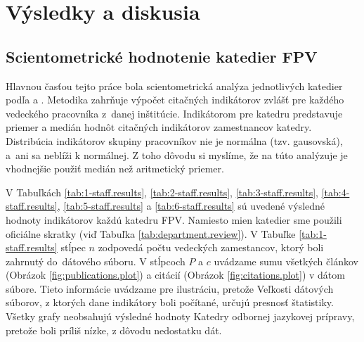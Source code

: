 \chapter{Výsledky a diskusia}

\section{Scientometrické hodnotenie katedier FPV}

Hlavnou časťou tejto práce bola scientometrická analýza jednotlivých katedier
podľa \citet{Kazakis2014a} a \citet{Kazakis2014b,Kazakis2015}. Metodika zahrňuje
výpočet citačných indikátorov zvlášť pre každého vedeckého pracovníka
z~danej inštitúcie. Indikátorom pre katedru predstavuje priemer a medián
hodnôt citačných indikátorov zamestnancov katedry.
Distribúcia indikátorov skupiny pracovníkov nie je normálna (tzv. gausovská),
a~ani sa neblíži k normálnej. Z toho dôvodu si myslíme, že na túto analýzuje je
vhodnejšie použiť medián než aritmetický priemer.

V Tabuľkách  \ref{tab:1-staff.results}, \ref{tab:2-staff.results},
\ref{tab:3-staff.results}, \ref{tab:4-staff.results}, \ref{tab:5-staff.results}
a \ref{tab:6-staff.results} sú uvedené výsledné hodnoty indikátorov každú
katedru FPV.  Namiesto mien katedier sme použili oficiálne skratky (viď Tabuľka
\ref{tab:department.review}).  V Tabuľke  \ref{tab:1-staff.results} stĺpec $n$
zodpovedá počtu vedeckých zamestancov, ktorý boli zahrnutý do~dátového súboru.
V stĺpcoch $P$ a $c$ uvádzame sumu všetkých článkov (Obrázok
\ref{fig:publications.plot}) a citácií (Obrázok \ref{fig:citations.plot})
v dátom súbore.  Tieto informácie uvádzame pre ilustráciu, pretože Veľkosti
dátových súborov, z ktorých dane indikátory boli počítané, určujú presnosť
štatistiky. Všetky grafy neobsahujú výsledné hodnoty Katedry odbornej
jazykovej prípravy, pretože boli príliš nízke, z dôvodu nedostatku dát.

